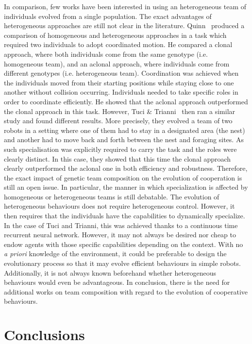    In comparison, few works have been interested in using an heterogeneous team of individuals evolved from a single population. The exact advantages of heterogeneous approaches are still not clear in the literature. Quinn~\parencite{Quinn2001} produced a comparison of homogeneous and heterogeneous approaches in a task which required two individuals to adopt coordinated motion. He compared a clonal approach, where both individuals come from the same genotype (i.e. homogeneous team), and an aclonal approach, where individuals come from different genotypes (i.e. heterogeneous team). Coordination was achieved when the individuals moved from their starting positions while staying close to one another without collision occurring. Individuals needed to take specific roles in order to coordinate efficiently. He showed that the aclonal approach outperformed the clonal approach in this task. However, Tuci \& Trianni~\parencite{Tuci2014} then ran a similar study and found different results. More precisely, they evolved a team of two robots in a setting where one of them had to stay in a designated area (the nest) and another had to move back and forth between the nest and foraging sites. As such specialisation was explicitly required to carry the task and the roles were clearly distinct. In this case, they showed that this time the clonal approach clearly outperformed the aclonal one in both efficiency and robustness.  Therefore, the exact impact of genetic team composition on the evolution of cooperation is still an open issue. In particular, the manner in which specialization is affected by homogeneous or heterogeneous teams is still debatable. The evolution of heterogeneous behaviours does not require heterogeneous control. However, it then requires that the individuals have the capabilities to dynamically specialize. In the case of Tuci and Trianni, this was achieved thanks to a continuous time recurrent neural network. However, it may not always be desired nor cheap to endow agents with those specific capabilities depending on the context. With no \emph{a priori} knowledge of the environment, it could be preferable to design the evolutionary process so that it may evolve efficient behaviours in simple robots. Additionally, it is not always known beforehand whether heterogeneous behaviours would even be advantageous. In conclusion, there is the need for additional works on team composition with regard to the evolution of cooperative behaviours.


\section{Conclusions}

